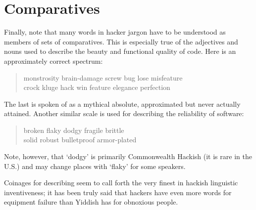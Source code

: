 \section*{Comparatives}\label{Comparatives}

	Finally, note that many words in hacker jargon have to be understood as members of sets of comparatives. This is especially true of the
	adjectives and nouns used to describe the beauty and functional quality of code. Here is an approximately correct spectrum:

	\begin{quote}
		monstrosity brain-damage screw bug lose misfeature\\
		crock kluge hack win feature elegance perfection
	\end{quote}

	The last is spoken of as a mythical absolute, approximated but never actually attained. Another similar scale is used for describing
	the reliability of software:

	\begin{quote}
		broken flaky dodgy fragile brittle\\
		solid robust bulletproof armor-plated
	\end{quote}

	Note, however, that `dodgy' is primarily Commonwealth Hackish (it is rare in the U.S.) and may change places with `flaky' for some
	speakers.

	Coinages for describing  seem to call forth the very finest in hackish linguistic inventiveness; it has been truly
	said that hackers have even more words for equipment failure than Yiddish has for obnoxious people.

